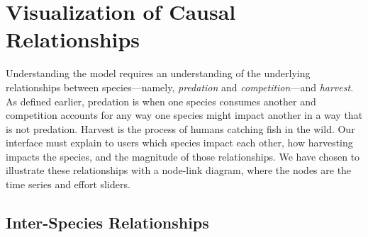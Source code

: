 \section{Visualization of Causal Relationships}

Understanding the model requires an understanding of the underlying relationships between species---namely, \textit{predation} and \textit{competition}---and \textit{harvest}.  As defined earlier, predation is when one species consumes another and competition accounts for any way one species might impact another in a way that is not predation.  Harvest is the process of humans catching fish in the wild.  Our interface must explain to users which species impact each other, how harvesting impacts the species, and the magnitude of those relationships.  We have chosen to illustrate these relationships with a node-link diagram, where the nodes are the time series and effort sliders.

\subsection{Inter-Species Relationships}
\label{sec:interSpeciesArc}


